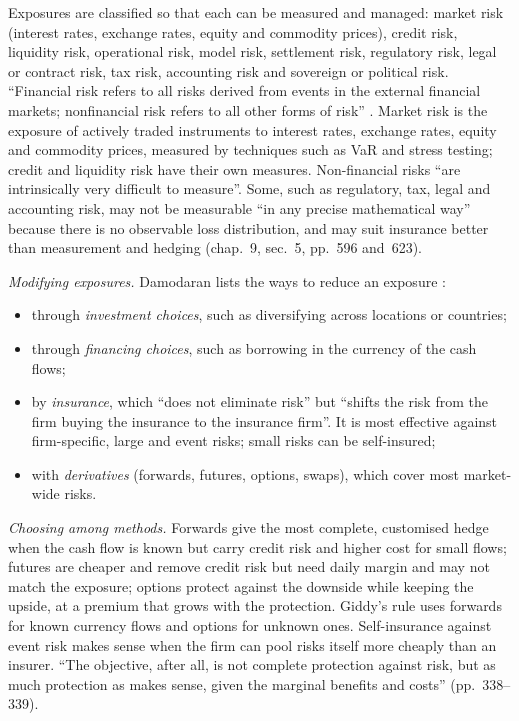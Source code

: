 \begin{qfmethod}\label{meth:risk-identification-modification}
 Exposures are classified so that each can be measured and managed: market risk (interest rates, exchange rates, equity and commodity prices), credit risk, liquidity risk, operational risk, model risk, settlement risk, regulatory risk, legal or contract risk, tax risk, accounting risk and sovereign or political risk. ``Financial risk refers to all risks derived from events in the external financial markets; nonfinancial risk refers to all other forms of risk'' \citep[chap.~9, pp.~585--586, Exhibit~9-3]{managing-investment-portfolios-2007}. Market risk is the exposure of actively traded instruments to interest rates, exchange rates, equity and commodity prices, measured by techniques such as VaR and stress testing; credit and liquidity risk have their own measures. Non-financial risks ``are intrinsically very difficult to measure''. Some, such as regulatory, tax, legal and accounting risk, may not be measurable ``in any precise mathematical way'' because there is no observable loss distribution, and may suit insurance better than measurement and hedging (chap.~9, sec.~5, pp.~596 and~623).

\emph{Modifying exposures.} Damodaran lists the ways to reduce an exposure \citep[chap.~10, pp.~331--335]{strategic-risk-taking-2008}:
\begin{itemize}
\item through \emph{investment choices}, such as diversifying across locations or countries;
\item through \emph{financing choices}, such as borrowing in the currency of the cash flows;
\item by \emph{insurance}, which ``does not eliminate risk'' but ``shifts the risk from the firm buying the insurance to the insurance firm''. It is most effective against firm-specific, large and event risks; small risks can be self-insured;
\item with \emph{derivatives} (forwards, futures, options, swaps), which cover most market-wide risks.
\end{itemize}
\emph{Choosing among methods.} Forwards give the most complete, customised hedge when the cash flow is known but carry credit risk and higher cost for small flows; futures are cheaper and remove credit risk but need daily margin and may not match the exposure; options protect against the downside while keeping the upside, at a premium that grows with the protection. Giddy's rule uses forwards for known currency flows and options for unknown ones. Self-insurance against event risk makes sense when the firm can pool risks itself more cheaply than an insurer. ``The objective, after all, is not complete protection against risk, but as much protection as makes sense, given the marginal benefits and costs'' (pp.~338--339).


\end{qfmethod}
